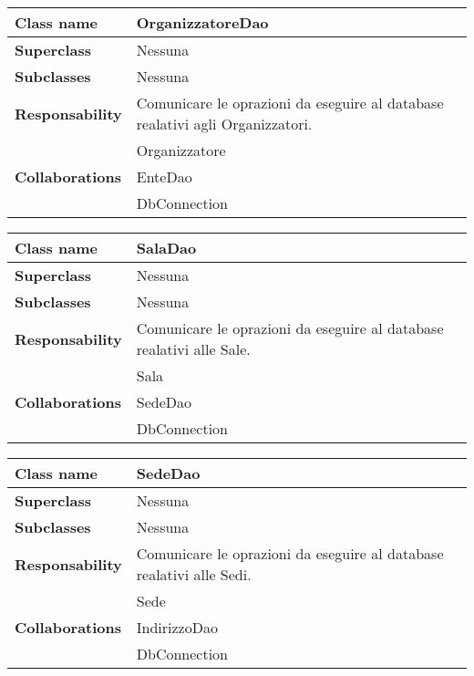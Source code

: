 \newpage
\begin{table}[h!]
	\begin{tabular}{|l|l|}
		\hline 
		\textbf{Class name} & OrganizzatoreDao
		\\ \hline
		\textbf{Superclass} & Nessuna
		\\ \hline
		\multirow{1}{*}{\textbf{Subclasses}} & Nessuna
		\\ \hline
		\textbf{Responsability} & Comunicare le oprazioni da eseguire al database realativi agli Organizzatori.
		\\ \hline
		\multirow{3}{*}{\textbf{Collaborations}} & Organizzatore \\ 
		& EnteDao \\
		& DbConnection \\ \hline
	\end{tabular}
\end{table}

\begin{table}[h!]
	\begin{tabular}{|l|l|}
		\hline 
		\textbf{Class name} & SalaDao
		\\ \hline
		\textbf{Superclass} & Nessuna
		\\ \hline
		\multirow{1}{*}{\textbf{Subclasses}} & Nessuna
		\\ \hline
		\textbf{Responsability} & Comunicare le oprazioni da eseguire al database realativi alle Sale.
		\\ \hline
		\multirow{3}{*}{\textbf{Collaborations}} & Sala \\ 
		& SedeDao \\
		& DbConnection \\ \hline
	\end{tabular}
\end{table}

\begin{table}[h!]
	\begin{tabular}{|l|l|}
		\hline 
		\textbf{Class name} & SedeDao
		\\ \hline
		\textbf{Superclass} & Nessuna
		\\ \hline
		\multirow{1}{*}{\textbf{Subclasses}} & Nessuna
		\\ \hline
		\textbf{Responsability} & Comunicare le oprazioni da eseguire al database realativi alle Sedi.
		\\ \hline
		\multirow{3}{*}{\textbf{Collaborations}} & Sede \\ 
		& IndirizzoDao \\
		& DbConnection \\ \hline
	\end{tabular}
\end{table}

